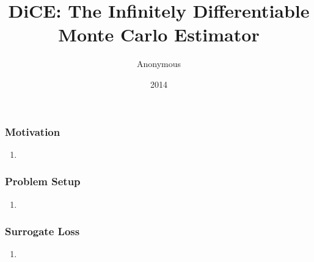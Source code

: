 \documentclass{beamer}
\title{DiCE: The Infinitely Differentiable Monte Carlo Estimator}
\author{Anonymous}
\institute{Overleaf}
\date{2014}
\begin{document}
 
\frame{\titlepage}
 
\begin{frame}
\frametitle{Motivation}
\begin{enumerate}
\item 
\end{enumerate}
\end{frame}

\begin{frame}
\frametitle{Problem Setup}
\begin{enumerate}
\item 
\end{enumerate}
\end{frame}

\begin{frame}
\frametitle{Surrogate Loss}
\begin{enumerate}
\item 
\end{enumerate}
\end{frame}
 
\end{document}
